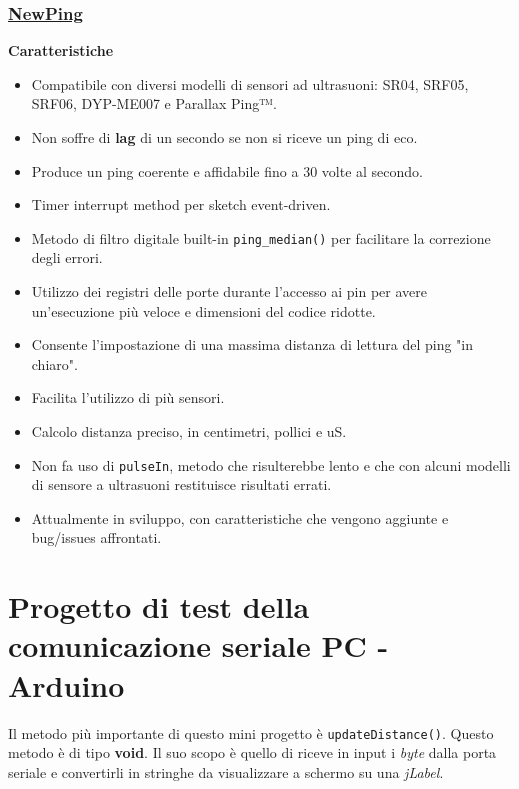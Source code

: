 \subsubsection{\underline{\href{http://playground.arduino.cc/Code/NewPing}{NewPing}}}\label{sec:newping}
\textbf{Caratteristiche}
\begin{itemize}
	\item Compatibile con diversi modelli di sensori ad ultrasuoni: SR04, SRF05, SRF06, DYP-ME007 e Parallax Ping™.
	
	\item Non soffre di \textbf{lag} di un secondo se non si riceve un ping di eco.
	
	\item Produce un ping coerente e affidabile fino a 30 volte al secondo.
	
	\item Timer interrupt method per sketch event-driven.
	
	\item Metodo di filtro digitale built-in \texttt{ping\_median()} per facilitare la correzione degli errori.
	
	\item Utilizzo dei registri delle porte durante l'accesso ai pin per avere un'esecuzione più veloce e dimensioni del codice ridotte.
	
	\item Consente l'impostazione di una massima distanza di lettura del ping "in chiaro".
	
	\item Facilita l'utilizzo di più sensori.
	
	\item Calcolo distanza preciso, in centimetri, pollici e uS.
	
	\item Non fa uso di \texttt{pulseIn}, metodo che risulterebbe lento e che con alcuni modelli di sensore a ultrasuoni restituisce risultati errati.
	
	\item Attualmente in sviluppo, con caratteristiche che vengono aggiunte e bug/issues affrontati.
\end{itemize}

\section{Progetto di test della comunicazione seriale PC - Arduino}
Il metodo più importante di questo mini progetto è \texttt{updateDistance()}. Questo metodo è di tipo \textbf{void}. Il suo scopo è quello di riceve in input i \textit{byte} dalla porta seriale e convertirli in stringhe da visualizzare a schermo su una \textit{jLabel}.

